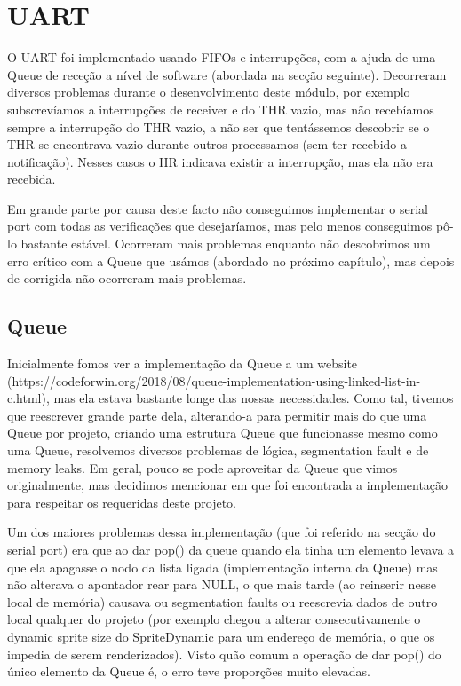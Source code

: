 \documentclass{report}
\begin{document}
\section{UART}

O UART foi implementado usando FIFOs e interrupções, com a ajuda de uma Queue de receção a nível de software (abordada na secção seguinte). Decorreram diversos problemas durante o desenvolvimento deste módulo, por exemplo subscrevíamos a interrupções de receiver e do THR vazio, mas não recebíamos sempre a interrupção do THR vazio, a não ser que tentássemos descobrir se o THR se encontrava vazio durante outros processamos (sem ter recebido a notificação). Nesses casos o IIR indicava existir a interrupção, mas ela não era recebida.

Em grande parte por causa deste facto não conseguimos implementar o serial port com todas as verificações que desejaríamos, mas pelo menos conseguimos pô-lo bastante estável. Ocorreram mais problemas enquanto não descobrimos um erro crítico com a Queue que usámos (abordado no próximo capítulo), mas depois de corrigida não ocorreram mais problemas.

\subsection{Queue}

Inicialmente fomos ver a implementação da Queue a um website (https://codeforwin.org/2018/08/queue-implementation-using-linked-list-in-c.html), mas ela estava bastante longe das nossas necessidades. Como tal, tivemos que reescrever grande parte dela, alterando-a para permitir mais do que uma Queue por projeto, criando uma estrutura Queue que funcionasse mesmo como uma Queue, resolvemos diversos problemas de lógica, segmentation fault e de memory leaks. Em geral, pouco se pode aproveitar da Queue que vimos originalmente, mas decidimos mencionar em que foi encontrada a implementação para respeitar os requeridas deste projeto.

Um dos maiores problemas dessa implementação (que foi referido na secção do serial port) era que ao dar pop() da queue quando ela tinha um elemento levava a que ela apagasse o nodo da lista ligada (implementação interna da Queue) mas não alterava o apontador rear para NULL, o que mais tarde (ao reinserir nesse local de memória) causava ou segmentation faults ou reescrevia dados de outro local qualquer do projeto (por exemplo chegou a alterar consecutivamente o dynamic sprite size do SpriteDynamic para um endereço de memória, o que os impedia de serem renderizados). Visto quão comum a operação de dar pop() do único elemento da Queue é, o erro teve proporções muito elevadas.
\end{document}
